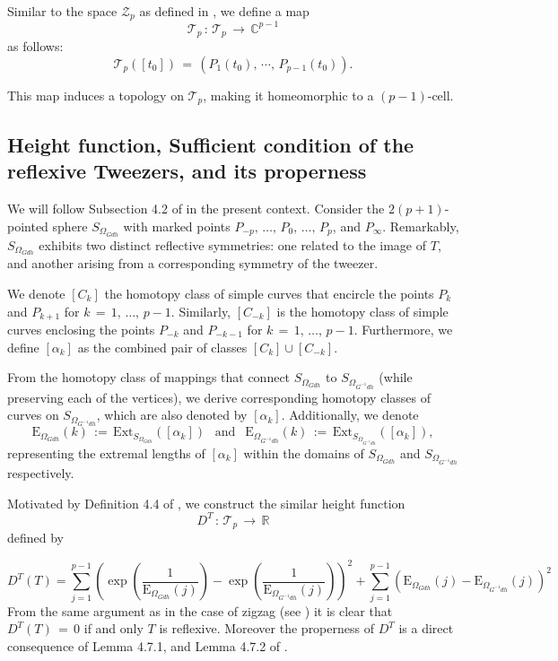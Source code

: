 \documentclass[12pt,epsfig,tikz,multi]{amsart}
\numberwithin{equation}{section}
\begin{document}
Similar to the space $\mathcal{Z}_p$ as defined in \cite{weber1998minimal}, we define a map 
$$\mathcal{T}_p\,:\,\mathcal{T}_p\,\longrightarrow\,\mathbb{C}^{p-1}$$ as follows:
\[
\mathcal{T}_p([t_0]) \,=\, (P_1(t_0),\,\cdots,\,P_{p-1}(t_0)).
\]

This map induces a topology on $\mathcal{T}_p$, making it homeomorphic to a $(p-1)$-cell. 


\subsection{Height function, Sufficient condition of the reflexive Tweezers, and its properness}

We will follow Subsection 4.2 of \cite{weber1998minimal} in the present context.  Consider the $2(p+1)$-pointed
sphere $S_{\Omega_{Gdh}}$ with marked points $P_{-p},\, \ldots,\, P_0,\, \ldots,\, P_p$, and $P_\infty$. Remarkably, 
$S_{\Omega_{Gdh}}$ exhibits two distinct reflective symmetries: one related to the image of $T$, and another 
arising from a corresponding symmetry of the tweezer.

We denote $[C_k]$ the homotopy class of simple curves that encircle the points $P_k$ and $P_{k+1}$ for
$k \,=\, 1,\, \ldots,\, p-1$. Similarly, $[C_{-k}]$ is the homotopy class of simple curves enclosing the
points $P_{-k}$ and $P_{-k-1}$ for $k \,=\, 1,\, \ldots,\, p - 1$. Furthermore, we define $[\alpha_k]$ as the combined pair of classes $[C_k] \cup [C_{-k}]$.

From the homotopy class of mappings that connect $S_{\Omega_{Gdh}}$ to $S_{\Omega_{G^{-1}dh}}$ (while preserving 
each of the vertices), we derive corresponding homotopy classes of curves on $S_{\Omega_{G^{-1}dh}}$, which are also
denoted by $[\alpha_k]$.
Additionally, we denote $$\text{E}_{\Omega_{Gdh}}(k)\,:=\, \text{Ext}_{S_{\Omega_{Gdh}}}([\alpha_k])
\ \  \text{ and } \ \ \text{E}_{\Omega_{G^{-1}dh}}(k)\,:=
\,\text{Ext}_{S_{\Omega_{G^{-1}dh}}}([\alpha_k]),$$ representing the extremal lengths of $[\alpha_k]$
within the domains of $S_{\Omega_{Gdh}}$ and $S_{\Omega_{G^{-1}dh}}$ respectively. 

Motivated by Definition 4.4 of \cite{weber1998minimal}, we construct the similar height function
$$D^T\,:\,\mathcal{T}_p \,\longrightarrow\, \mathbb{R}$$ defined by

\begin{equation}\label{defn: DT}
D^T(T) = \sum_{j=1}^{p-1} \left(\exp\left(\frac{1}{\text{E}_{\Omega_{Gdh}}(j)}\right) - \exp\left(\frac{1}{\text{E}_{\Omega_{G^{-1}dh}}(j)}\right)\right)^2 +  \sum_{j=1}^{p-1}\left(\text{E}_{\Omega_{Gdh}}(j) - \text{E}_{\Omega_{G^{-1}dh}}(j)\right)^{2}
\end{equation}
From the same argument as in the case of zigzag (see \cite[Section 4.3]{weber1998minimal}) it is clear that
$D^T(T)\,=\,0$ if and only $T$ is reflexive. Moreover the properness of $D^T$  is a direct consequence of
Lemma 4.7.1, and Lemma 4.7.2 of \cite{Weber1998TeichmullerTA}.
\end{document}
